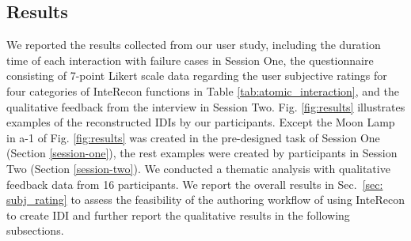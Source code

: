 \subsection{Results}
\label{fi:overview_results}
We reported the results collected from our user study, including the duration time of each interaction with failure cases in Session One, the questionnaire consisting of 7-point Likert scale data regarding the user subjective ratings for four categories of InteRecon functions in Table \ref{tab:atomic_interaction}, and the qualitative feedback from the interview in Session Two. 
Fig. \ref{fig:results} illustrates examples of the reconstructed IDIs by our participants.
Except the Moon Lamp in a-1 of Fig. \ref{fig:results} was created in the pre-designed task of Session One (Section \ref{session-one}), the rest examples were created by participants in Session Two (Section \ref{session-two}). 
We conducted a thematic analysis with qualitative feedback data from 16 participants. 
We report the overall results in Sec.~\ref{sec: subj_rating} to assess the feasibility of the authoring workflow of using InteRecon to create IDI and further report the qualitative results in the following subsections.


